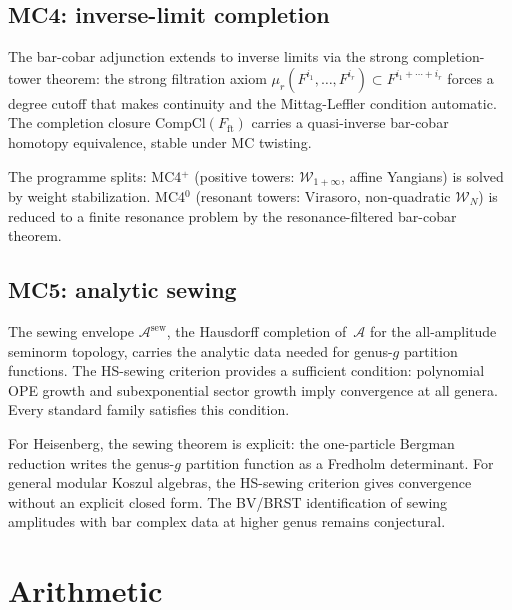 \documentclass[11pt,reqno]{amsart}
\theoremstyle{definition}
\theoremstyle{remark}
\providecommand{\cA}{\mathcal{A}}
\providecommand{\cW}{\mathcal{W}}
\numberwithin{equation}{section}
\begin{document}
\subsection{MC4: inverse-limit completion}
\label{ssec:mc4}

The bar-cobar adjunction extends to inverse limits via the
strong completion-tower theorem: the strong filtration axiom
$\mu_r(F^{i_1}, \ldots, F^{i_r})
\subset F^{i_1 + \cdots + i_r}$
forces a degree cutoff that makes continuity and the
Mittag-Leffler condition automatic. The completion closure
$\mathrm{CompCl}(F_{\mathrm{ft}})$ carries a quasi-inverse
bar-cobar homotopy equivalence, stable under MC twisting.

The programme splits: MC4$^+$ (positive towers:
$\cW_{1+\infty}$, affine Yangians) is solved by weight
stabilization. MC4$^0$ (resonant towers: Virasoro,
non-quadratic $\cW_N$) is reduced to a finite resonance
problem by the resonance-filtered bar-cobar theorem.

\subsection{MC5: analytic sewing}
\label{ssec:mc5}

The sewing envelope $\cA^{\mathrm{sew}}$, the Hausdorff
completion of~$\cA$ for the all-amplitude seminorm
topology, carries the analytic data needed for genus-$g$
partition functions. The HS-sewing criterion provides a
sufficient condition: polynomial OPE growth and
subexponential sector growth imply convergence at all
genera. Every standard family satisfies this condition.

For Heisenberg, the sewing theorem is explicit: the
one-particle Bergman reduction writes the genus-$g$
partition function as a Fredholm determinant. For general
modular Koszul algebras, the HS-sewing criterion gives
convergence without an explicit closed form. The BV/BRST
identification of sewing amplitudes with bar complex
data at higher genus remains conjectural.


\section{Arithmetic}
\label{sec:arithmetic}
\end{document}
